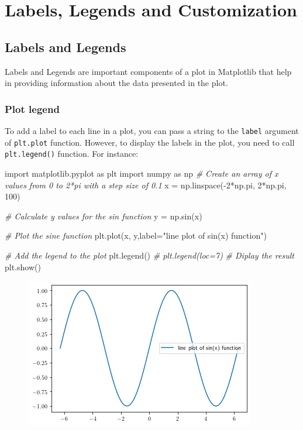 \documentclass[11pt]{article}
\newenvironment{Shaded}{}{}
\newcommand{\DecValTok}[1]{\textcolor[rgb]{0.25,0.63,0.44}{{#1}}}
\newcommand{\StringTok}[1]{\textcolor[rgb]{0.25,0.44,0.63}{{#1}}}
\newcommand{\CommentTok}[1]{\textcolor[rgb]{0.38,0.63,0.69}{\textit{{#1}}}}
\newcommand{\NormalTok}[1]{{#1}}
\newcommand{\ImportTok}[1]{{#1}}
\newcommand{\OperatorTok}[1]{\textcolor[rgb]{0.40,0.40,0.40}{{#1}}}
\begin{document}
\hypertarget{labels-legends-and-customization}{%
\section{Labels, Legends and
Customization}\label{labels-legends-and-customization}}

\hypertarget{labels-and-legends}{%
\subsection{Labels and Legends}\label{labels-and-legends}}

Labels and Legends are important components of a plot in Matplotlib that
help in providing information about the data presented in the plot.

\hypertarget{Plot-legend}{%
\subsubsection{Plot legend}\label{Plot-legend}}
 To add a label to each line in a plot, you can pass
a string to the \texttt{label} argument of \texttt{plt.plot} function.
However, to display the labels in the plot, you need to call
\texttt{plt.legend()} function. For instance:

\begin{Shaded}
\begin{Highlighting}[]
\ImportTok{import}\NormalTok{ matplotlib.pyplot }\ImportTok{as}\NormalTok{ plt}
\ImportTok{import}\NormalTok{ numpy }\ImportTok{as}\NormalTok{ np}
\CommentTok{\# Create an array of x values from 0 to 2*pi with a step size of 0.1}
\NormalTok{x }\OperatorTok{=}\NormalTok{ np.linspace(}\OperatorTok{{-}}\DecValTok{2}\OperatorTok{*}\NormalTok{np.pi, }\DecValTok{2}\OperatorTok{*}\NormalTok{np.pi, }\DecValTok{100}\NormalTok{)}

\CommentTok{\# Calculate y values for the sin function}
\NormalTok{y }\OperatorTok{=}\NormalTok{ np.sin(x)}

\CommentTok{\# Plot the sine function}
\NormalTok{plt.plot(x, y,label}\OperatorTok{=}\StringTok{"line plot of sin(x) function"}\NormalTok{)}

\CommentTok{\# Add the legend to the plot}
\NormalTok{plt.legend()}
\CommentTok{\# plt.legend(loc=7)}
\CommentTok{\# Diplay the result}
\NormalTok{plt.show()}
\end{Highlighting}
\end{Shaded}

\begin{figure}
\centering
\includegraphics[scale=0.6]{legend.png}
\end{figure}
\end{document}
